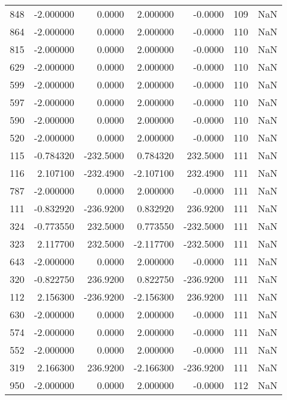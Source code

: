 \begin{tabular}{rrrrrrr}
 848 &   -2.000000 &    0.0000 &    2.000000 &     -0.0000 &         109 & NaN \\
 864 &   -2.000000 &    0.0000 &    2.000000 &     -0.0000 &         110 & NaN \\
 815 &   -2.000000 &    0.0000 &    2.000000 &     -0.0000 &         110 & NaN \\
 629 &   -2.000000 &    0.0000 &    2.000000 &     -0.0000 &         110 & NaN \\
 599 &   -2.000000 &    0.0000 &    2.000000 &     -0.0000 &         110 & NaN \\
 597 &   -2.000000 &    0.0000 &    2.000000 &     -0.0000 &         110 & NaN \\
 590 &   -2.000000 &    0.0000 &    2.000000 &     -0.0000 &         110 & NaN \\
 520 &   -2.000000 &    0.0000 &    2.000000 &     -0.0000 &         110 & NaN \\
 115 &   -0.784320 & -232.5000 &    0.784320 &    232.5000 &         111 & NaN \\
 116 &    2.107100 & -232.4900 &   -2.107100 &    232.4900 &         111 & NaN \\
 787 &   -2.000000 &    0.0000 &    2.000000 &     -0.0000 &         111 & NaN \\
 111 &   -0.832920 & -236.9200 &    0.832920 &    236.9200 &         111 & NaN \\
 324 &   -0.773550 &  232.5000 &    0.773550 &   -232.5000 &         111 & NaN \\
 323 &    2.117700 &  232.5000 &   -2.117700 &   -232.5000 &         111 & NaN \\
 643 &   -2.000000 &    0.0000 &    2.000000 &     -0.0000 &         111 & NaN \\
 320 &   -0.822750 &  236.9200 &    0.822750 &   -236.9200 &         111 & NaN \\
 112 &    2.156300 & -236.9200 &   -2.156300 &    236.9200 &         111 & NaN \\
 630 &   -2.000000 &    0.0000 &    2.000000 &     -0.0000 &         111 & NaN \\
 574 &   -2.000000 &    0.0000 &    2.000000 &     -0.0000 &         111 & NaN \\
 552 &   -2.000000 &    0.0000 &    2.000000 &     -0.0000 &         111 & NaN \\
 319 &    2.166300 &  236.9200 &   -2.166300 &   -236.9200 &         111 & NaN \\
 950 &   -2.000000 &    0.0000 &    2.000000 &     -0.0000 &         112 & NaN \\

\end{tabular}
